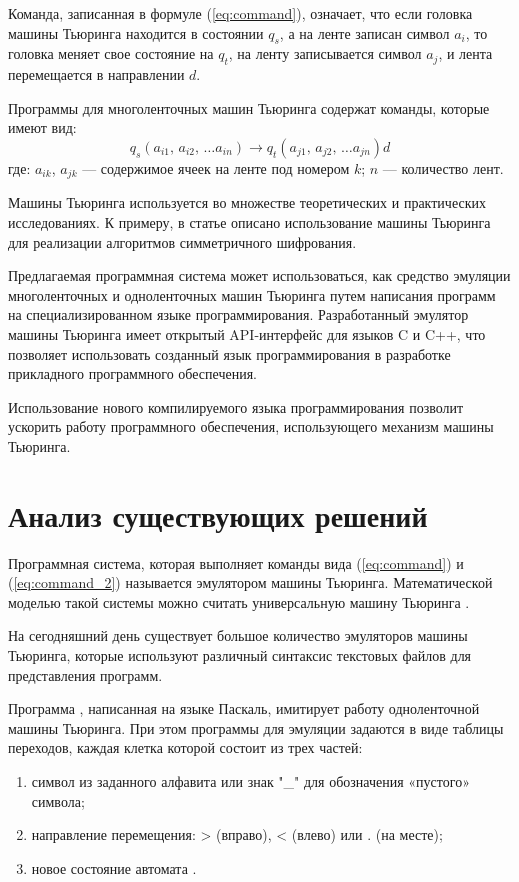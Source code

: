 \documentclass[10pt, normalheadings]{scrartcl}
\begin{document}
Команда, записанная в формуле (\ref{eq:command}), означает, что если головка машины Тьюринга находится в состоянии $q_s$, а на ленте записан символ $a_i$, то головка меняет свое состояние на $q_t$, на ленту записывается символ $a_j$, и лента перемещается в направлении $d$.

Программы для многоленточных машин Тьюринга содержат команды, которые имеют вид:
\begin{equation}\label{eq:command_2}
q_s \left( a_{i1},\,a_{i2},\,\ldots a_{in} \right) \rightarrow q_t \left( a_{j1},\,a_{j2},\,\ldots a_{jn} \right) d
\end{equation}
где: $a_{ik}$, $a_{jk}$ --- содержимое ячеек на ленте под номером $k$; $n$ --- количество лент.

Машины Тьюринга используется во множестве теоретических и практических исследованиях. К примеру, в статье \cite{Chernuchko_Crypto} описано использование машины Тьюринга для реализации алгоритмов симметричного шифрования.

Предлагаемая программная система может использоваться, как средство эмуляции многоленточных и одноленточных машин Тьюринга путем написания программ на специализированном языке программирования. Разработанный эмулятор машины Тьюринга имеет открытый API-интерфейс для языков C и C++, что позволяет использовать созданный язык программирования в разработке прикладного программного обеспечения.

Использование нового компилируемого языка программирования позволит ускорить работу программного обеспечения, использующего механизм машины Тьюринга.

\section*{Анализ существующих решений}

Программная система, которая выполняет команды вида (\ref{eq:command}) и (\ref{eq:command_2}) называется эмулятором машины Тьюринга. Математической моделью такой системы можно считать универсальную машину Тьюринга \cite[с.~87]{Guts_Mathem_Logic}.

На сегодняшний день существует большое количество эмуляторов машины Тьюринга, которые используют различный синтаксис текстовых файлов для представления программ.

Программа \cite{Polyakov_Turing}, написанная на языке Паскаль, имитирует работу одноленточной машины Тьюринга. При этом программы для эмуляции задаются в виде таблицы переходов, каждая клетка которой состоит из трех частей:
\begin{enumerate}
	\item символ из заданного алфавита или знак "\_" для обозначения «пустого» символа;
	\item направление перемещения: > (вправо), < (влево) или . (на месте);
	\item новое состояние автомата \cite{Polyakov_Turing}.
\end{enumerate}
\end{document}
